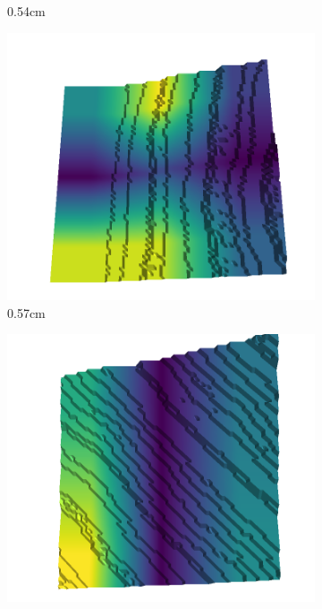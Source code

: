 \documentclass[../document.tex]{subfiles}
\begin{document}
\begin{figure}[H]
\begin{subfigure}[b]{0.192\linewidth}
    \caption{0.54cm}
    \label{fig : quarry-best-10}
    \end{subfigure}
    \begin{subfigure}[b]{0.192\linewidth}
    \includegraphics[width=\linewidth]{../img/5/quarry/best/56-patch-3d-majavi-colormap-110.png}
    \caption{0.57cm}
    \label{fig : quarry-best-11}
    \end{subfigure}
    \begin{subfigure}[b]{0.192\linewidth}
    \includegraphics[width=\linewidth]{../img/5/quarry/best/58-patch-3d-majavi-colormap-120.png}

\end{subfigure}
\end{figure}
\end{document}
